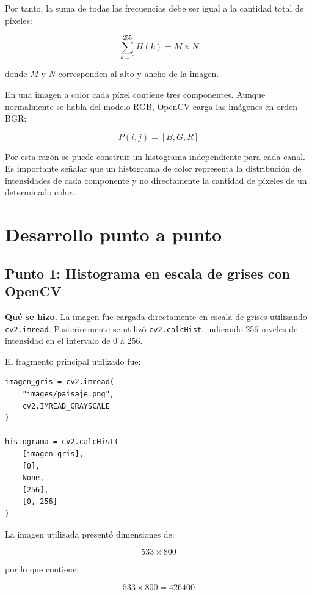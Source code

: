 \documentclass[11pt,letterpaper]{article}
\begin{document}
Por tanto, la suma de todas las frecuencias debe ser igual a la cantidad total de píxeles:

\begin{equation}
\sum_{k=0}^{255} H(k) = M \times N
\end{equation}

donde $M$ y $N$ corresponden al alto y ancho de la imagen.

En una imagen a color cada píxel contiene tres componentes. Aunque normalmente se habla del modelo RGB, OpenCV carga las imágenes en orden BGR:

\begin{equation}
P(i,j)=[B,G,R]
\end{equation}

Por esta razón se puede construir un histograma independiente para cada canal. Es importante señalar que un histograma de color representa la distribución de intensidades de cada componente y no directamente la cantidad de píxeles de un determinado color.

\section{Desarrollo punto a punto}

\subsection{Punto 1: Histograma en escala de grises con OpenCV}

\textbf{Qué se hizo.} La imagen fue cargada directamente en escala de grises utilizando \texttt{cv2.imread}. Posteriormente se utilizó \texttt{cv2.calcHist}, indicando 256 niveles de intensidad en el intervalo de 0 a 256.

El fragmento principal utilizado fue:

\begin{lstlisting}
imagen_gris = cv2.imread(
    "images/paisaje.png",
    cv2.IMREAD_GRAYSCALE
)

histograma = cv2.calcHist(
    [imagen_gris],
    [0],
    None,
    [256],
    [0, 256]
)
\end{lstlisting}

La imagen utilizada presentó dimensiones de:

\begin{equation}
533 \times 800
\end{equation}

por lo que contiene:

\begin{equation}
533 \times 800 = 426400
\end{equation}
\end{document}
